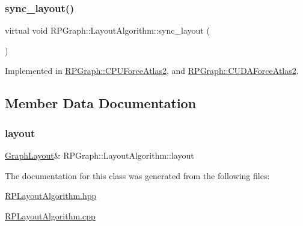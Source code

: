 \subsubsection{\texorpdfstring{sync\+\_\+layout()}{sync\_layout()}}
{\footnotesize\ttfamily virtual void R\+P\+Graph\+::\+Layout\+Algorithm\+::sync\+\_\+layout (\begin{DoxyParamCaption}{ }\end{DoxyParamCaption})\hspace{0.3cm}{\ttfamily [pure virtual]}}



Implemented in \mbox{\hyperlink{classRPGraph_1_1CPUForceAtlas2_afaada68053fce521843af0eb5ca316df}{R\+P\+Graph\+::\+C\+P\+U\+Force\+Atlas2}}, and \mbox{\hyperlink{classRPGraph_1_1CUDAForceAtlas2_a474a1cd717352057859185885b8020cf}{R\+P\+Graph\+::\+C\+U\+D\+A\+Force\+Atlas2}}.



\subsection{Member Data Documentation}
\mbox{\label{classRPGraph_1_1LayoutAlgorithm_ac2335a7ccaeb6cef789ea59b99353cf9}} 
\subsubsection{\texorpdfstring{layout}{layout}}
{\footnotesize\ttfamily \mbox{\hyperlink{classRPGraph_1_1GraphLayout}{Graph\+Layout}}\& R\+P\+Graph\+::\+Layout\+Algorithm\+::layout}



The documentation for this class was generated from the following files\+:\begin{DoxyCompactItemize}
\item 
\mbox{\hyperlink{RPLayoutAlgorithm_8hpp}{R\+P\+Layout\+Algorithm.\+hpp}}\item 
\mbox{\hyperlink{RPLayoutAlgorithm_8cpp}{R\+P\+Layout\+Algorithm.\+cpp}}\end{DoxyCompactItemize}
